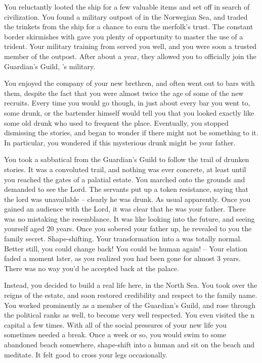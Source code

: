 \documentclass[char]{NeptuneBall}
\begin{document}
You reluctantly looted the ship for a few valuable items and set off in search of civilization. You found a military outpost of \pAtlantis{} in the Norwegian Sea, and traded the trinkets from the ship for a chance to earn the merfolk's trust.  The constant border skirmishes with \pPacifica{} gave you plenty of opportunity to master the use of a trident. Your military training from \pAmerica{} served you well, and you were soon a trusted member of the outpost. After about a year, they allowed you to officially join the Guardian's Guild, \pAtlantis{}'s military.

You enjoyed the company of your new brethren, and often went out to bars with them, despite the fact that you were almost twice the age of some of the new recruits. Every time you would go though, in just about every bar you went to, some drunk, or the bartender himself would tell you that you looked exactly like some old drunk who used to frequent the place. Eventually, you stopped dismissing the stories, and began to wonder if there might not be something to it. In particular, you wondered if this mysterious drunk might be your father.

You took a sabbatical from the Guardian's Guild to follow the trail of drunken stories. It was a convoluted trail, and nothing was ever concrete, at least until you reached the gates of a palatial estate. You marched onto the grounds and demanded to see the Lord. The servants put up a token resistance, saying that the lord was unavailable -- clearly he was drunk. As usual apparently. Once you gained an audience with the Lord, it was clear that he was your father. There was no mistaking the resemblance. It was like looking into the future, and seeing yourself aged 20 years. Once you sobered your father up, he revealed to you the family secret. Shape-shifting. Your transformation into a \cGeneral{\mer} was totally normal. Better still, you could change back! You could be human again! -- Your elation faded a moment later, as you realized you had been gone for almost 3 years. There was no way you'd be accepted back at the palace.

Instead, you decided to build a real life here, in the North Sea. You took over the reigns of the estate, and soon restored credibility and respect to the family name. You worked prominently as a member of the Guardian's Guild, and rose through the political ranks as well, to become very well respected. You even visited the \pAtlantis{}n capital a few times. With all of the social pressures of your new life you sometimes needed a break. Once a week or so, you would swim to some abandoned beach somewhere, shape-shift into a human and sit on the beach and meditate. It felt good to cross your legs occasionally.
\end{document}
